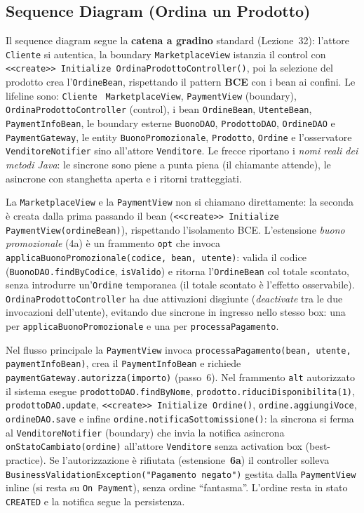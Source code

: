 \subsection{Sequence Diagram (Ordina un Prodotto)}\sloppy
Il sequence diagram segue la \textbf{catena a gradino} standard (Lezione~32): l'attore \texttt{Cliente} si autentica, la boundary \texttt{MarketplaceView} istanzia il control con \texttt{<<create>> Initialize OrdinaProdottoController()}, poi la selezione del prodotto crea l'\texttt{OrdineBean}, rispettando il pattern \textbf{BCE} con i bean ai confini. Le lifeline sono: \texttt{Cliente} \textrightarrow\ \texttt{MarketplaceView}, \texttt{PaymentView} (boundary), \texttt{OrdinaProdottoController} (control), i bean \texttt{OrdineBean}, \texttt{UtenteBean}, \texttt{PaymentInfoBean}, le boundary esterne \texttt{BuonoDAO}, \texttt{ProdottoDAO}, \texttt{OrdineDAO} e \texttt{PaymentGateway}, le entity \texttt{BuonoPromozionale}, \texttt{Prodotto}, \texttt{Ordine} e l'osservatore \texttt{VenditoreNotifier} sino all'attore \texttt{Venditore}. Le frecce riportano i \emph{nomi reali dei metodi Java}: le sincrone sono piene a punta piena (il chiamante attende), le asincrone con stanghetta aperta e i ritorni tratteggiati.

La \texttt{MarketplaceView} e la \texttt{PaymentView} non si chiamano direttamente: la seconda è creata dalla prima passando il bean (\texttt{<<create>> Initialize PaymentView(ordineBean)}), rispettando l'isolamento BCE. L'estensione \emph{buono promozionale} (4a) è un frammento \texttt{opt} che invoca \texttt{applicaBuonoPromozionale(codice, bean, utente)}: valida il codice (\texttt{BuonoDAO.findByCodice}, \texttt{isValido}) e ritorna l'\texttt{OrdineBean} col totale scontato, senza introdurre un'\texttt{Ordine} temporanea (il totale scontato è l'effetto osservabile). \texttt{OrdinaProdottoController} ha due attivazioni disgiunte (\emph{deactivate} tra le due invocazioni dell'utente), evitando due sincrone in ingresso nello stesso box: una per \texttt{applicaBuonoPromozionale} e una per \texttt{processaPagamento}.

Nel flusso principale la \texttt{PaymentView} invoca \texttt{processaPagamento(bean, utente, paymentInfoBean)}, crea il \texttt{PaymentInfoBean} e richiede \texttt{paymentGateway.autorizza(importo)} (passo~6). Nel frammento \texttt{alt} autorizzato il sistema esegue \texttt{prodottoDAO.findByNome}, \texttt{prodotto.ri\-duciDisponibilita\-(1)}, \texttt{prodot\-toDAO.update}, \texttt{<<create>> Initialize Ordine()}, \texttt{ordine.aggiungiVoce}, \texttt{ordineDAO.save} e infine \texttt{ordine.noti\-ficaSottomissione()}: la sincrona si ferma al \texttt{VenditoreNotifier} (boundary) che invia la notifica asincrona \texttt{onStatoCambiato(ordine)} all'attore \texttt{Venditore} senza activation box (best-practice). Se l'autorizzazione è rifiutata (estensione~\textbf{6a}) il controller solleva \texttt{BusinessValidat\-ion\-Exception("Pagamento negato")} gestita dalla \texttt{PaymentView} inline (si resta su \texttt{On Payment}), senza ordine ``fantasma''. L'ordine resta in stato \texttt{CREATED} e la notifica segue la persistenza.




